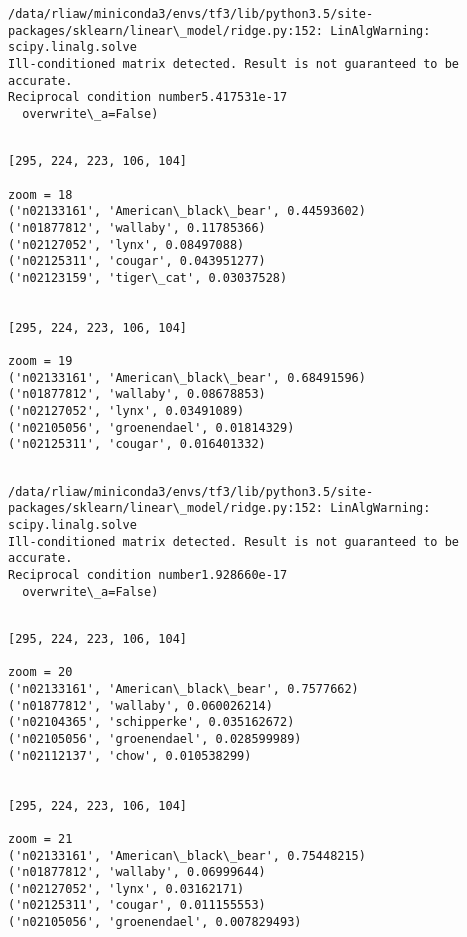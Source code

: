 \documentclass[11pt]{article}
\begin{document}
    \begin{Verbatim}[commandchars=\\\{\}]
/data/rliaw/miniconda3/envs/tf3/lib/python3.5/site-packages/sklearn/linear\_model/ridge.py:152: LinAlgWarning: scipy.linalg.solve
Ill-conditioned matrix detected. Result is not guaranteed to be accurate.
Reciprocal condition number5.417531e-17
  overwrite\_a=False)

    \end{Verbatim}

    \begin{Verbatim}[commandchars=\\\{\}]

[295, 224, 223, 106, 104]

zoom = 18
('n02133161', 'American\_black\_bear', 0.44593602)
('n01877812', 'wallaby', 0.11785366)
('n02127052', 'lynx', 0.08497088)
('n02125311', 'cougar', 0.043951277)
('n02123159', 'tiger\_cat', 0.03037528)


[295, 224, 223, 106, 104]

zoom = 19
('n02133161', 'American\_black\_bear', 0.68491596)
('n01877812', 'wallaby', 0.08678853)
('n02127052', 'lynx', 0.03491089)
('n02105056', 'groenendael', 0.01814329)
('n02125311', 'cougar', 0.016401332)


    \end{Verbatim}

    \begin{Verbatim}[commandchars=\\\{\}]
/data/rliaw/miniconda3/envs/tf3/lib/python3.5/site-packages/sklearn/linear\_model/ridge.py:152: LinAlgWarning: scipy.linalg.solve
Ill-conditioned matrix detected. Result is not guaranteed to be accurate.
Reciprocal condition number1.928660e-17
  overwrite\_a=False)

    \end{Verbatim}

    \begin{Verbatim}[commandchars=\\\{\}]

[295, 224, 223, 106, 104]

zoom = 20
('n02133161', 'American\_black\_bear', 0.7577662)
('n01877812', 'wallaby', 0.060026214)
('n02104365', 'schipperke', 0.035162672)
('n02105056', 'groenendael', 0.028599989)
('n02112137', 'chow', 0.010538299)


[295, 224, 223, 106, 104]

zoom = 21
('n02133161', 'American\_black\_bear', 0.75448215)
('n01877812', 'wallaby', 0.06999644)
('n02127052', 'lynx', 0.03162171)
('n02125311', 'cougar', 0.011155553)
('n02105056', 'groenendael', 0.007829493)


    \end{Verbatim}
\end{document}
